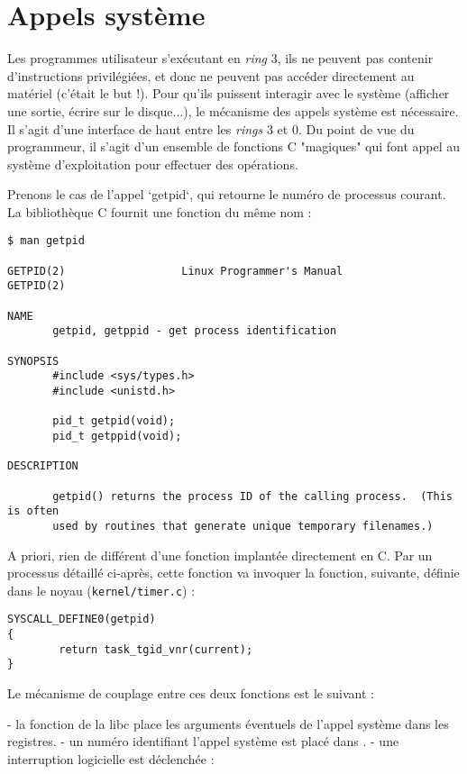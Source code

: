 \section{Appels système}

Les programmes utilisateur s'exécutant en \emph{ring} 3, ils ne peuvent pas
contenir d'instructions privilégiées, et donc ne peuvent pas accéder directement
au matériel (c'était le but !). Pour qu'ils puissent interagir avec le système
(afficher une sortie, écrire sur le disque...), le mécanisme des appels système
est nécessaire. Il s'agit d'une interface de haut entre les \emph{rings} 3 et 0.
Du point de vue du programmeur, il s'agit d'un ensemble de fonctions C
"magiques" qui font appel au système d'exploitation pour effectuer des
opérations.

Prenons le cas de l'appel `getpid`, qui retourne le numéro de processus courant.
La bibliothèque C fournit une fonction du même nom :

\begin{Verbatim}
$ man getpid

GETPID(2)                  Linux Programmer's Manual                  GETPID(2)

NAME
       getpid, getppid - get process identification

SYNOPSIS
       #include <sys/types.h>
       #include <unistd.h>

       pid_t getpid(void);
       pid_t getppid(void);

DESCRIPTION

       getpid() returns the process ID of the calling process.  (This is often
       used by routines that generate unique temporary filenames.)
\end{Verbatim}

A priori, rien de différent d'une fonction implantée directement en C. Par un
processus détaillé ci-après, cette fonction va invoquer la fonction, suivante,
définie dans le noyau (\texttt{kernel/timer.c}) :

\begin{Verbatim}
SYSCALL_DEFINE0(getpid)
{
        return task_tgid_vnr(current);
}
\end{Verbatim}

Le mécanisme de couplage entre ces deux fonctions est le suivant :

  - la fonction de la libc place les arguments éventuels de l'appel système dans
    les registres.
  - un numéro identifiant l'appel système est placé dans \eax.
  - une interruption logicielle est déclenchée :
